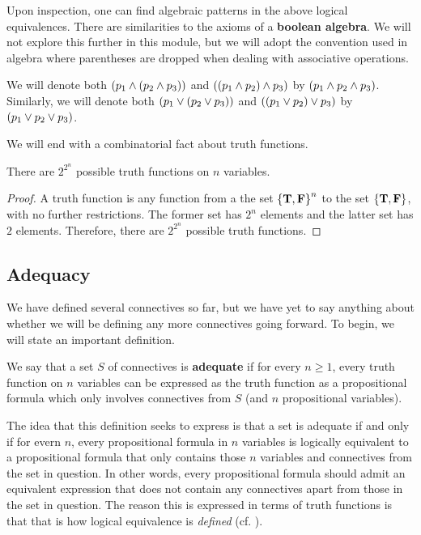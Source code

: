 Upon inspection, one can find algebraic patterns in the above logical equivalences. There are similarities to the axioms of a \textbf{boolean algebra}. %
We will not explore this further in this module, but we will adopt the convention used in algebra where parentheses are dropped when dealing with associative operations.

\begin{boxconvention}
    We will denote both $\left( p_1 \land \left( p_2 \land p_3 \right) \right)$ and $\left( \left( p_1 \land p_2 \right) \land p_3 \right)$ by $\left( p_1 \land p_2 \land p_3 \right)$. Similarly, we will denote both $\left( p_1 \lor \left( p_2 \lor p_3 \right) \right)$ and $\left( \left( p_1 \lor p_2 \right) \lor p_3 \right)$ by $\left( p_1 \lor p_2 \lor p_3 \right)$.
\end{boxconvention}

We will end with a combinatorial fact about truth functions.

\begin{boxlemma}
    There are $2^{2^n}$ possible truth functions on $n$ variables.
\end{boxlemma}
\begin{proof}
    A truth function is any function from a the set $\left\{ \mathbf{T}, \mathbf{F} \right\}^n$ to the set $\left\{ \mathbf{T}, \mathbf{F} \right\}$, with no further restrictions. The former set has $2^n$ elements and the latter set has $2$ elements. Therefore, there are $2^{2^n}$ possible truth functions.
\end{proof}

\subsection{Adequacy}

We have defined several connectives so far, but we have yet to say anything about whether we will be defining any more connectives going forward. To begin, we will state an important definition.

\begin{boxdefinition}[Adequacy]\label{Ch1:Def:Adequacy}
    We say that a set $S$ of connectives is \textbf{adequate} if for every $n \geq 1$, every truth function on $n$ variables can be expressed as the truth function as a propositional formula which only involves connectives from $S$ (and $n$ propositional variables).
\end{boxdefinition}

The idea that this definition seeks to express is that a set is adequate if and only if for evern $n$, every propositional formula in $n$ variables is logically equivalent to a propositional formula that only contains those $n$ variables and connectives from the set in question. In other words, every propositional formula should admit an equivalent expression that does not contain any connectives apart from those in the set in question. The reason this is expressed in terms of truth functions is that that is how logical equivalence is \textit{defined} (cf. ).

